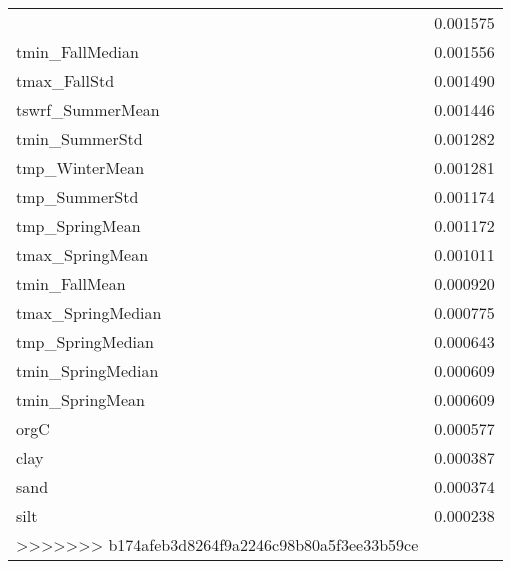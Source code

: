 \begin{tabular}{lr}
\begin{tabular}{rrrrr}
tmp_FallStd & 0.001575 \\
tmin_FallMedian & 0.001556 \\
tmax_FallStd & 0.001490 \\
tswrf_SummerMean & 0.001446 \\
tmin_SummerStd & 0.001282 \\
tmp_WinterMean & 0.001281 \\
tmp_SummerStd & 0.001174 \\
tmp_SpringMean & 0.001172 \\
tmax_SpringMean & 0.001011 \\
tmin_FallMean & 0.000920 \\
tmax_SpringMedian & 0.000775 \\
tmp_SpringMedian & 0.000643 \\
tmin_SpringMedian & 0.000609 \\
tmin_SpringMean & 0.000609 \\
orgC & 0.000577 \\
clay & 0.000387 \\
sand & 0.000374 \\
silt & 0.000238 \\
>>>>>>> b174afeb3d8264f9a2246c98b80a5f3ee33b59ce
\bottomrule
\end{tabular}
